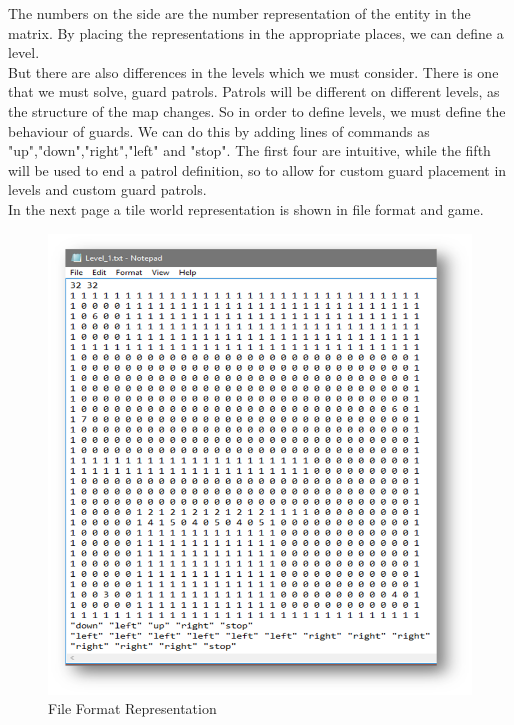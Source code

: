 \documentclass[12pt]{article}
\begin{document}
The numbers on the side are the number representation of the entity in the matrix. By placing the representations in the appropriate places, we can define a level.\\
But there are also differences in the levels which we must consider. There is one that we must solve, guard patrols. Patrols will be different on different levels, as the structure of the map changes. So in order to define levels, we must define the behaviour of guards. We can do this by adding lines of commands as "up","down","right","left" and "stop". The first four are intuitive, while the fifth will be used to end a patrol definition, so to allow for custom guard placement in levels and custom guard patrols.\\
In the next page a tile world representation is shown in file format and game.
\begin{figure}
\centering
\includegraphics[scale=.7]{Picture2.png} 
\caption{File Format Representation}

\end{figure}
\end{document}
